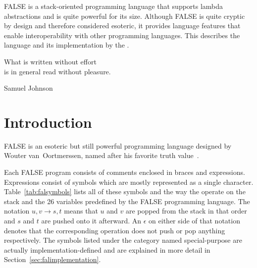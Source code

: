 




\renewcommand{\seefalse}{}

{FALSE is a stack-oriented programming language that supports lambda abstractions and is quite powerful for its size.
Although FALSE is quite cryptic by design and therefore considered esoteric, it provides language features that enable interoperability with other programming languages.
This \documentation{} describes the language and its implementation by the \ecs{}.}

\epigraph{What is written without effort \\ is in general read without pleasure.}{Samuel Johnson}

\section{Introduction}

FALSE is an esoteric but still powerful programming language designed by Wouter van~Oortmerssen, named after his favorite truth value~\cite{oortmerssen1993}.

\begin{center}\fallogo{2em}\end{center}

Each FALSE program consists of comments enclosed in braces and expressions.
Expressions consist of symbols which are mostly represented as a single character.
Table~\ref{tab:falsymbols} lists all of these symbols and the way the operate on the stack and the 26 variables predefined by the FALSE programming language.
The notation $u, v \to s, t$ means that $u$ and $v$ are popped from the stack in that order and $s$ and $t$ are pushed onto it afterward.
An $\epsilon$ on either side of that notation denotes that the corresponding operation does not push or pop anything respectively.
The symbols listed under the category named special-purpose are actually implementation-defined and are explained in more detail in Section~\ref{sec:falimplementation}.

